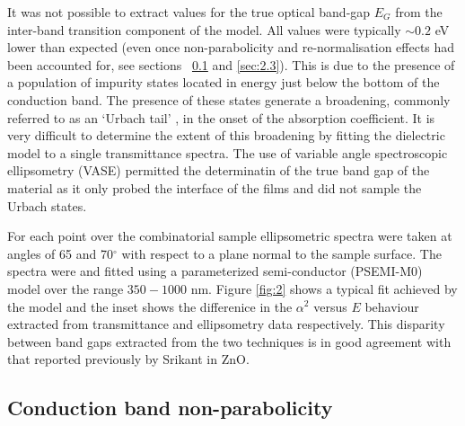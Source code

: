 \documentclass[preprint]{elsarticle}
\begin{document}
It was not possible to extract values for the true optical band-gap $E_G$ from the inter-band transition component of the model. All values were typically $\sim 0.2$ eV lower than expected (even once non-parabolicity and re-normalisation effects had been accounted for, see sections ~\ref{sec:2.2} and \ref{sec:2.3}).  This is due to the presence of a population of impurity states located in energy just below the bottom of the conduction band. The presence of these states generate a broadening, commonly referred to as an `Urbach tail' \cite{Urbach1953}, in the onset of the absorption coefficient. It is very difficult to determine the extent of this broadening by fitting the dielectric model to a single transmittance spectra. The use of variable angle spectroscopic ellipsometry (VASE) permitted the determinatin of the true band gap of the material as it only probed the interface of the films and did not sample the Urbach states.

For each point over the combinatorial sample ellipsometric spectra were taken at angles of 65 and 70$^{\circ}$ with respect to a plane normal to the sample surface. The spectra were and fitted using a parameterized semi-conductor (PSEMI-M0) model \cite{Paulson1998} over the range $350 - 1000$ nm. Figure \ref{fig:2} shows a typical fit achieved by the model and the inset shows the differenice in the $\alpha^2$ versus $E$ behaviour extracted from transmittance and ellipsometry data respectively. This disparity between band gaps extracted from the two techniques is in good agreement with that reported previously by Srikant \cite{Srikant1998} in ZnO.

\subsection{ Conduction band non-parabolicity}
\label{sec:2.2}
\end{document}
